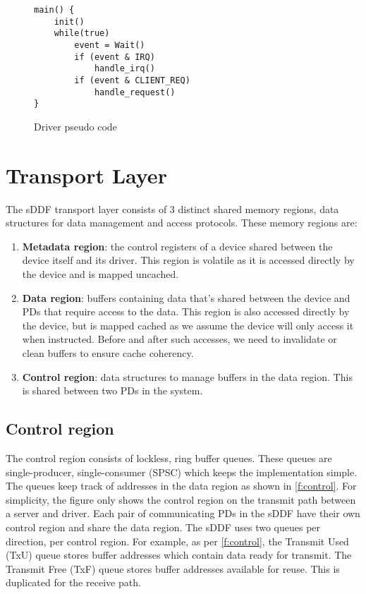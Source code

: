 \begin{figure} [H]
\begin{verbatim}
main() {
    init()
    while(true)
        event = Wait()
        if (event & IRQ)
            handle_irq()
        if (event & CLIENT_REQ)
            handle_request()
}
\end{verbatim}
\caption{Driver pseudo code}
\label{l:driver_pseudo}
\end{figure}


\section{Transport Layer}
The sDDF transport layer consists of 3 distinct shared memory regions, data structures for data management
and access protocols. These memory regions are:
\begin{enumerate}
    \item \textbf{Metadata region}: the control registers of a device shared between the device itself and its driver. 
    This region is volatile as it is accessed directly by the device and is mapped uncached. 
    \item \textbf{Data region}: buffers containing data that's shared between the device and PDs that require access to the data.
    This region is also accessed directly by the device, but is mapped cached as we assume the device will only access it when 
    instructed. Before and after such accesses, we need to invalidate or clean buffers to ensure cache coherency.
    \item \textbf{Control region}: data structures to manage buffers in the data region. This is shared between two PDs in the system. 
\end{enumerate}

\subsection{Control region}
The control region consists of lockless, ring buffer queues. These queues are single-producer,
single-consumer (SPSC) which keeps the implementation simple.
The queues keep track of addresses in the data region as shown in \autoref{f:control}. For simplicity,
the figure only shows the control region on the transmit path between a server and driver. Each pair of 
communicating PDs in the sDDF have their own control region and share the data region. 
The sDDF uses two queues per direction, per control region. For example, as per \autoref{f:control}, the 
Transmit Used (TxU) queue stores buffer addresses which contain data ready for transmit. 
The Transmit Free (TxF) queue stores buffer addresses available for reuse. This is duplicated for the receive path.

